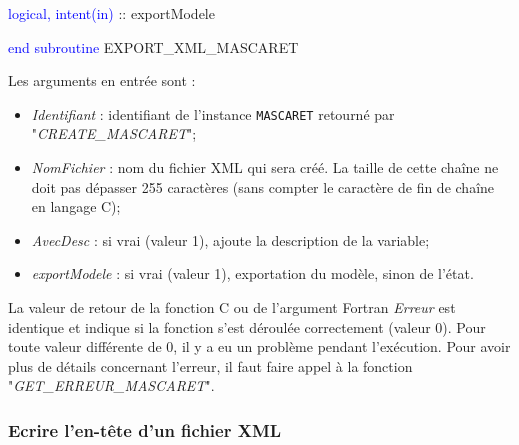 \documentclass[a4paper,11pt]{article}
\begin{document}
        \hspace{1cm} \textcolor{blue}{logical, intent(in)} :: exportModele
        
    \textcolor{blue}{end subroutine} EXPORT\_XML\_MASCARET
    
 \vspace{0.5cm}
 
 Les arguments en entr\'ee sont :
 
 \vspace{0.5cm}
 
 \begin{itemize}
 
    \item \textit{Identifiant} : identifiant de l'instance \texttt{MASCARET} retourn\'e par "\textit{CREATE\_MASCARET}";
    
    \vspace{0.5cm}
    
    \item \textit{NomFichier} : nom du fichier XML qui sera cr\'e\'e. La taille de cette cha\^ine ne doit pas d\'epasser 255 caract\`eres (sans compter le caract\`ere de fin de cha\^ine en langage C);
    
    \vspace{0.5cm}
    
    \item \textit{AvecDesc} : si vrai (valeur 1), ajoute la description de la variable;
    
    \vspace{0.5cm}
    
    \item \textit{exportModele} : si vrai (valeur 1), exportation du mod\`ele, sinon de l'\'etat.
    
 \end{itemize}
 
 \vspace{0.5cm}
 
 La valeur de retour de la fonction C ou de l'argument Fortran \textit{Erreur} est identique et indique si la fonction s'est d\'eroul\'ee correctement (valeur 0). Pour toute valeur diff\'erente de 0, il y a eu un probl\`eme pendant l'ex\'ecution. Pour avoir plus de d\'etails concernant l'erreur, il faut faire appel \`a la fonction "\textit{GET\_ERREUR\_MASCARET}".

\subsubsection{Ecrire l'en-t\^ete d'un fichier XML}
\end{document}
